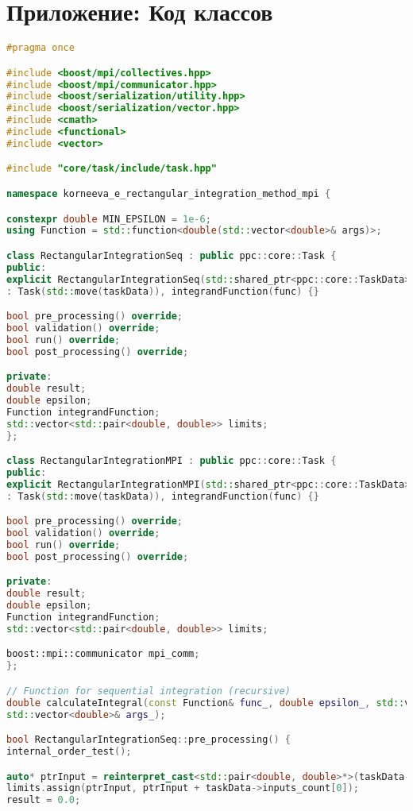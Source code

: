 \documentclass[12pt]{article}
\begin{document}
\newpage
\section*{Приложение: Код классов}

\begin{lstlisting}[language=C++]
#pragma once

#include <boost/mpi/collectives.hpp>
#include <boost/mpi/communicator.hpp>
#include <boost/serialization/utility.hpp>
#include <boost/serialization/vector.hpp>
#include <cmath>
#include <functional>
#include <vector>

#include "core/task/include/task.hpp"

namespace korneeva_e_rectangular_integration_method_mpi {

constexpr double MIN_EPSILON = 1e-6;
using Function = std::function<double(std::vector<double>& args)>;

class RectangularIntegrationSeq : public ppc::core::Task {
public:
explicit RectangularIntegrationSeq(std::shared_ptr<ppc::core::TaskData> taskData, Function& func)
: Task(std::move(taskData)), integrandFunction(func) {}

bool pre_processing() override;
bool validation() override;
bool run() override;
bool post_processing() override;

private:
double result;
double epsilon;
Function integrandFunction;
std::vector<std::pair<double, double>> limits;
};

class RectangularIntegrationMPI : public ppc::core::Task {
public:
explicit RectangularIntegrationMPI(std::shared_ptr<ppc::core::TaskData> taskData, Function& func)
: Task(std::move(taskData)), integrandFunction(func) {}

bool pre_processing() override;
bool validation() override;
bool run() override;
bool post_processing() override;

private:
double result;
double epsilon;
Function integrandFunction;
std::vector<std::pair<double, double>> limits;

boost::mpi::communicator mpi_comm;
};

// Function for sequential integration (recursive)
double calculateIntegral(const Function& func_, double epsilon_, std::vector<std::pair<double, double>>& limits_,
std::vector<double>& args_);

bool RectangularIntegrationSeq::pre_processing() {
internal_order_test();

auto* ptrInput = reinterpret_cast<std::pair<double, double>*>(taskData->inputs[0]);
limits.assign(ptrInput, ptrInput + taskData->inputs_count[0]);
result = 0.0;


\end{lstlisting}
\end{document}
